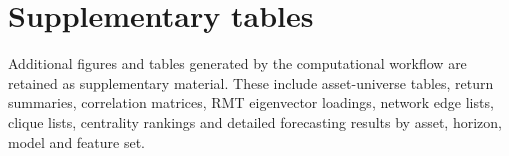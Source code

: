 \section{Supplementary tables}
\label{app:supplementary_tables}


Additional figures and tables generated by the computational workflow are retained as supplementary material. These include asset-universe tables, return summaries, correlation matrices, RMT eigenvector loadings, network edge lists, clique lists, centrality rankings and detailed forecasting results by asset, horizon, model and feature set.

